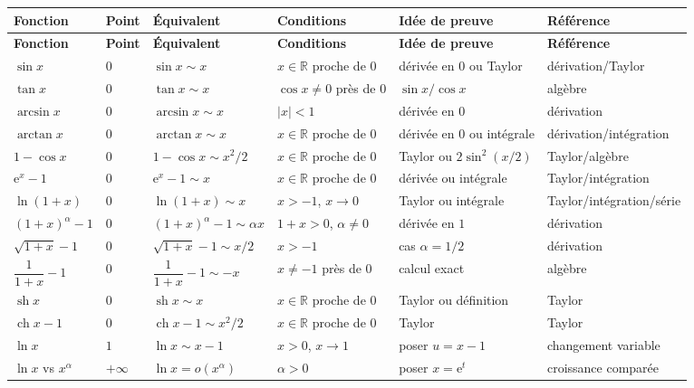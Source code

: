 \documentclass[11pt,a4paper]{article}
\newcommand{\R}{\mathbb{R}}
\newcommand{\e}{\mathrm{e}}
\DeclareMathOperator{\sh}{sh}
\DeclareMathOperator{\ch}{ch}
\begin{document}
\renewcommand{\arraystretch}{1.18}
{\footnotesize
\setlength{\tabcolsep}{2pt}
\begin{longtable}{>{\raggedright\arraybackslash}p{2.45cm}>{\raggedright\arraybackslash}p{1.35cm}>{\raggedright\arraybackslash}p{2.65cm}>{\raggedright\arraybackslash}p{2.75cm}>{\raggedright\arraybackslash}p{2.25cm}>{\raggedright\arraybackslash}p{2.1cm}}
\toprule
\textbf{Fonction} & \textbf{Point} & \textbf{Équivalent} & \textbf{Conditions} & \textbf{Idée de preuve} & \textbf{Référence}\\
\midrule
\endfirsthead
\toprule
\textbf{Fonction} & \textbf{Point} & \textbf{Équivalent} & \textbf{Conditions} & \textbf{Idée de preuve} & \textbf{Référence}\\
\midrule
\endhead
$\sin x$ & $0$ & $\sin x\sim x$ & $x\in\R$ proche de $0$ & dérivée en $0$ ou Taylor & dérivation/Taylor\\
$\tan x$ & $0$ & $\tan x\sim x$ & $\cos x\ne0$ près de $0$ & $\sin x/\cos x$ & algèbre\\
$\arcsin x$ & $0$ & $\arcsin x\sim x$ & $|x|<1$ & dérivée en $0$ & dérivation\\
$\arctan x$ & $0$ & $\arctan x\sim x$ & $x\in\R$ proche de $0$ & dérivée en $0$ ou intégrale & dérivation/intégration\\
$1-\cos x$ & $0$ & $1-\cos x\sim x^2/2$ & $x\in\R$ proche de $0$ & Taylor ou $2\sin^2(x/2)$ & Taylor/algèbre\\
$\e^x-1$ & $0$ & $\e^x-1\sim x$ & $x\in\R$ proche de $0$ & dérivée ou intégrale & Taylor/intégration\\
$\ln(1+x)$ & $0$ & $\ln(1+x)\sim x$ & $x>-1$, $x\to0$ & Taylor ou intégrale & Taylor/intégration/série\\
$(1+x)^\alpha-1$ & $0$ & $(1+x)^\alpha-1\sim \alpha x$ & $1+x>0$, $\alpha\ne0$ & dérivée en $1$ & dérivation\\
$\sqrt{1+x}-1$ & $0$ & $\sqrt{1+x}-1\sim x/2$ & $x>-1$ & cas $\alpha=1/2$ & dérivation\\
$\dfrac1{1+x}-1$ & $0$ & $\dfrac1{1+x}-1\sim -x$ & $x\ne-1$ près de $0$ & calcul exact & algèbre\\
$\sh x$ & $0$ & $\sh x\sim x$ & $x\in\R$ proche de $0$ & Taylor ou définition & Taylor\\
$\ch x-1$ & $0$ & $\ch x-1\sim x^2/2$ & $x\in\R$ proche de $0$ & Taylor & Taylor\\
$\ln x$ & $1$ & $\ln x\sim x-1$ & $x>0$, $x\to1$ & poser $u=x-1$ & changement variable\\
$\ln x$ vs $x^\alpha$ & $+\infty$ & $\ln x=o(x^\alpha)$ & $\alpha>0$ & poser $x=\e^t$ & croissance comparée\\

\end{longtable}}
\end{document}
